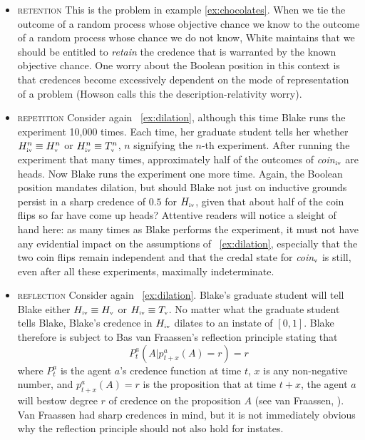 \documentclass[phd,12pt,oneside]{ubcthesis}
\begin{document}
\begin{itemize}
\item \textsc{retention} This is the problem in example
  \ref{ex:chocolates}. When we tie the outcome of a random process
  whose objective chance we know to the outcome of a random process
  whose chance we do not know, White maintains that we should be
  entitled to \emph{retain} the credence that is warranted by the
  known objective chance. One worry about the Boolean position in this
  context is that credences become excessively dependent on the mode
  of representation of a problem (Howson calls this the
  description-relativity worry).
\item \textsc{repetition} Consider again {\xample}~\ref{ex:dilation},
  although this time Blake runs the experiment 10,000 times. Each
  time, her graduate student tells her whether
  $H^{n}_{\mbox{\tiny{iv}}}\equiv{}H^{n}_{\mbox{\tiny{v}}}$ or
  $H^{n}_{\mbox{\tiny{iv}}}\equiv{}T^{n}_{\mbox{\tiny{v}}}$, $n$
  signifying the $n$-th experiment. After running the experiment that
  many times, approximately half of the outcomes of
  \textit{coin}$_{\mbox{\tiny{iv}}}$ are heads. Now Blake runs the
  experiment one more time. Again, the Boolean position mandates
  dilation, but should Blake not just on inductive grounds persist in
  a sharp credence of $0.5$ for $H_{\mbox{\tiny{iv}}}$, given that
  about half of the coin flips so far have come up heads? Attentive
  readers will notice a sleight of hand here: as many times as Blake
  performs the experiment, it must not have any evidential impact on
  the assumptions of {\xample}~\ref{ex:dilation}, especially that the
  two coin flips remain independent and that the credal state for 
  \textit{coin}$_{\mbox{\tiny{v}}}$ is still, even after all these
  experiments, maximally indeterminate. 
\item \textsc{reflection} Consider again {\xample}~\ref{ex:dilation}.
  Blake's graduate student will tell Blake either
  $H_{\mbox{\tiny{iv}}}\equiv{}H_{\mbox{\tiny{v}}}$ or
  $H_{\mbox{\tiny{iv}}}\equiv{}T_{\mbox{\tiny{v}}}$. No matter what
  the graduate student tells Blake, Blake's credence in
  $H_{\mbox{\tiny{iv}}}$ dilates to an instate of $[0,1]$. Blake
  therefore is subject to Bas van Fraassen's reflection principle
  stating that
  \begin{equation}
    \label{eq:reflection}
    P_{t}^{a}(A|p_{t+x}^{a}(A)=r)=r
  \end{equation}
  where $P_{t}^{a}$ is the agent $a$'s credence function at time $t$,
  $x$ is any non-negative number, and $p_{t+x}^{a}(A)=r$ is the
  proposition that at time $t+x$, the agent $a$ will bestow degree $r$
  of credence on the proposition $A$ (see van
  Fraassen, ). Van Fraassen had sharp
  credences in mind, but it is not immediately obvious why the
  reflection principle should not also hold for instates.
\end{itemize}
\end{document}

